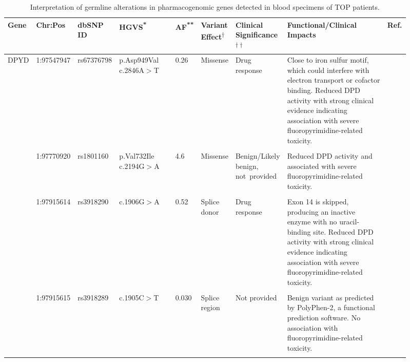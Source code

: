 \begin{landscape}

\begin{longtable}{p{0.07\linewidth}|p{0.09\linewidth}p{0.085\linewidth}p{0.14\linewidth}p{0.05\linewidth}p{0.065\linewidth}p{0.11\linewidth}p{0.25\linewidth}p{0.05\linewidth}}
	\caption{Interpretation of germline alterations in pharmacogenomic genes detected in blood specimens of TOP patients.}
	\label{tbl:germline_pgx_genes}
	\\
	\hline
	Gene & Chr:Pos & dbSNP ID & HGVS\textsuperscript{*} & AF\textsuperscript{**} & Variant Effect\textsuperscript{$\dagger$} & Clinical Significance\textsuperscript{$\dagger\dagger$} & Functional/Clinical Impacts & Ref.
	\\
	\hline
	DPYD & 1:97547947 & rs67376798 & p.Asp949Val c.2846A$>$T & 0.26 & Missense & Drug response
	&
	 Close to iron sulfur motif, which could interfere with electron transport or cofactor binding. Reduced DPD activity with strong clinical evidence indicating association with severe fluoropyrimidine-related toxicity.
	&
	\cite{VanKuilenburg2016, Toffoli2015, Lee2014, Deenen2011, Kuilenburg2000, Swen2011, Caudle2013, Amstutz2009, Schwab2008, Morel2006, Mattison2002, Dobritzsch2001, Boige2016, Offer2014, Meulendijks2015}
	\\
	\\
	& 1:97770920 & rs1801160 & p.Val732Ile c.2194G$>$A & 4.6 & Missense & Benign/Likely benign, \mbox{not provided} & Reduced DPD activity and associated with severe fluoropyrimidine-related toxicity. & \cite{Schwab2008, Kuilenburg2000, Gentile2016, Deenen2011, Boige2016, VanKuilenburg2016}
	\\
	\\
	& 1:97915614 & rs3918290 & c.1906G$>$A & 0.52 & Splice donor & Drug response & Exon 14 is skipped, producing an inactive enzyme with no uracil-binding site. Reduced DPD activity with strong clinical evidence indicating association with severe fluoropyrimidine-related toxicity. & \cite{Toffoli2015, Lee2014, Caudle2013, Swen2011, Kuilenburg2000, Deenen2011, Amstutz2009, Schwab2008, Morel2006, Gentile2016, VanKuilenburg2016, Meulendijks2015}
	\\
	\\
	& 1:97915615 & rs3918289 & c.1905C$>$T & 0.030 & Splice region & Not provided & Benign variant as predicted by PolyPhen-2, a functional prediction software. No association with fluoropyrimidine-related toxicity. & \cite{Boige2016, Offer2014}
	\\
	\\

\end{longtable}
\end{landscape}
